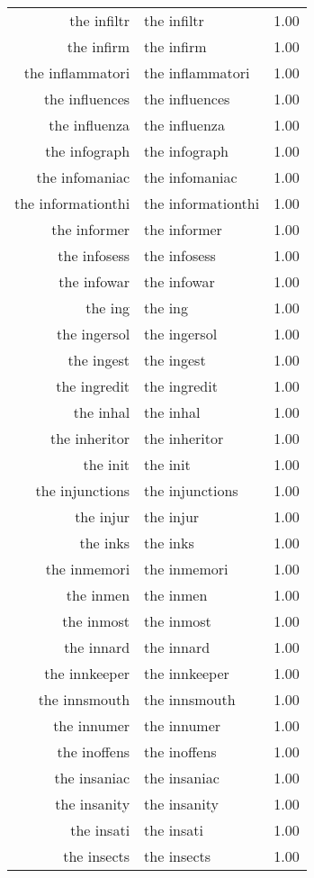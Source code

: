 \begin{table}[ht]
\begin{tabular}{rlr}
  the infiltr & the infiltr & 1.00 \\ 
  the infirm & the infirm & 1.00 \\ 
  the inflammatori & the inflammatori & 1.00 \\ 
  the influences & the influences & 1.00 \\ 
  the influenza & the influenza & 1.00 \\ 
  the infograph & the infograph & 1.00 \\ 
  the infomaniac & the infomaniac & 1.00 \\ 
  the informationthi & the informationthi & 1.00 \\ 
  the informer & the informer & 1.00 \\ 
  the infosess & the infosess & 1.00 \\ 
  the infowar & the infowar & 1.00 \\ 
  the ing & the ing & 1.00 \\ 
  the ingersol & the ingersol & 1.00 \\ 
  the ingest & the ingest & 1.00 \\ 
  the ingredit & the ingredit & 1.00 \\ 
  the inhal & the inhal & 1.00 \\ 
  the inheritor & the inheritor & 1.00 \\ 
  the init & the init & 1.00 \\ 
  the injunctions & the injunctions & 1.00 \\ 
  the injur & the injur & 1.00 \\ 
  the inks & the inks & 1.00 \\ 
  the inmemori & the inmemori & 1.00 \\ 
  the inmen & the inmen & 1.00 \\ 
  the inmost & the inmost & 1.00 \\ 
  the innard & the innard & 1.00 \\ 
  the innkeeper & the innkeeper & 1.00 \\ 
  the innsmouth & the innsmouth & 1.00 \\ 
  the innumer & the innumer & 1.00 \\ 
  the inoffens & the inoffens & 1.00 \\ 
  the insaniac & the insaniac & 1.00 \\ 
  the insanity & the insanity & 1.00 \\ 
  the insati & the insati & 1.00 \\ 
  the insects & the insects & 1.00 \\ 

\end{tabular}
\end{table}
